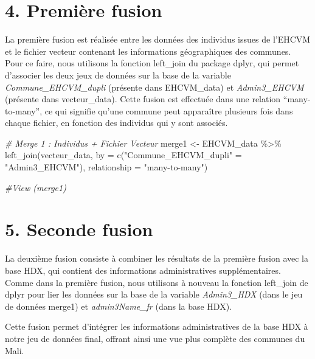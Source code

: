 \documentclass[
]{article}
\newenvironment{Shaded}{\begin{snugshade}}{\end{snugshade}}
\newcommand{\AttributeTok}[1]{\textcolor[rgb]{0.77,0.63,0.00}{#1}}
\newcommand{\CommentTok}[1]{\textcolor[rgb]{0.56,0.35,0.01}{\textit{#1}}}
\newcommand{\FunctionTok}[1]{\textcolor[rgb]{0.00,0.00,0.00}{#1}}
\newcommand{\NormalTok}[1]{#1}
\newcommand{\OtherTok}[1]{\textcolor[rgb]{0.56,0.35,0.01}{#1}}
\newcommand{\SpecialCharTok}[1]{\textcolor[rgb]{0.00,0.00,0.00}{#1}}
\newcommand{\StringTok}[1]{\textcolor[rgb]{0.31,0.60,0.02}{#1}}
\begin{document}
\hypertarget{premiuxe8re-fusion}{%
\section{4. Première fusion}\label{premiuxe8re-fusion}}

La première fusion est réalisée entre les données des individus issues
de l'EHCVM et le fichier vecteur contenant les informations
géographiques des communes. Pour ce faire, nous utilisons la fonction
left\_join du package dplyr, qui permet d'associer les deux jeux de
données sur la base de la variable \emph{Commune\_EHCVM\_dupli}
(présente dans EHCVM\_data) et \emph{Admin3\_EHCVM} (présente dans
vecteur\_data). Cette fusion est effectuée dans une relation
``many-to-many'', ce qui signifie qu'une commune peut apparaître
plusieurs fois dans chaque fichier, en fonction des individus qui y sont
associés.

\begin{Shaded}
\begin{Highlighting}[]
\CommentTok{\# Merge 1 : Individus + Fichier Vecteur}
\NormalTok{merge1 }\OtherTok{\textless{}{-}}\NormalTok{ EHCVM\_data }\SpecialCharTok{\%\textgreater{}\%}
  \FunctionTok{left\_join}\NormalTok{(vecteur\_data, }\AttributeTok{by =} \FunctionTok{c}\NormalTok{(}\StringTok{"Commune\_EHCVM\_dupli"} \OtherTok{=} \StringTok{"Admin3\_EHCVM"}\NormalTok{),}
            \AttributeTok{relationship =} \StringTok{"many{-}to{-}many"}\NormalTok{) }

\CommentTok{\#View (merge1)}
\end{Highlighting}
\end{Shaded}

\hypertarget{seconde-fusion}{%
\section{5. Seconde fusion}\label{seconde-fusion}}

La deuxième fusion consiste à combiner les résultats de la première
fusion avec la base HDX, qui contient des informations administratives
supplémentaires. Comme dans la première fusion, nous utilisons à nouveau
la fonction left\_join de dplyr pour lier les données sur la base de la
variable \emph{Admin3\_HDX} (dans le jeu de données merge1) et
\emph{admin3Name\_fr} (dans la base HDX).

Cette fusion permet d'intégrer les informations administratives de la
base HDX à notre jeu de données final, offrant ainsi une vue plus
complète des communes du Mali.
\end{document}
